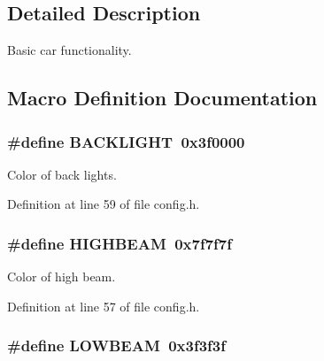 \subsection{Detailed Description}
Basic car functionality. 



\subsection{Macro Definition Documentation}
\subsubsection[{\texorpdfstring{B\+A\+C\+K\+L\+I\+G\+HT}{BACKLIGHT}}]{\setlength{\rightskip}{0pt plus 5cm}\#define B\+A\+C\+K\+L\+I\+G\+HT~0x3f0000}\hypertarget{group__car_gae97ccf06dd29b2a0500f378068b678e2}{}\label{group__car_gae97ccf06dd29b2a0500f378068b678e2}


Color of back lights. 



Definition at line 59 of file config.\+h.

\subsubsection[{\texorpdfstring{H\+I\+G\+H\+B\+E\+AM}{HIGHBEAM}}]{\setlength{\rightskip}{0pt plus 5cm}\#define H\+I\+G\+H\+B\+E\+AM~0x7f7f7f}\hypertarget{group__car_ga3f561f12573270e4b5329bc5930ad20f}{}\label{group__car_ga3f561f12573270e4b5329bc5930ad20f}


Color of high beam. 



Definition at line 57 of file config.\+h.

\subsubsection[{\texorpdfstring{L\+O\+W\+B\+E\+AM}{LOWBEAM}}]{\setlength{\rightskip}{0pt plus 5cm}\#define L\+O\+W\+B\+E\+AM~0x3f3f3f}\hypertarget{group__car_ga61bb8d5dab460079c1b621b2d8a4bd9c}{}\label{group__car_ga61bb8d5dab460079c1b621b2d8a4bd9c}



